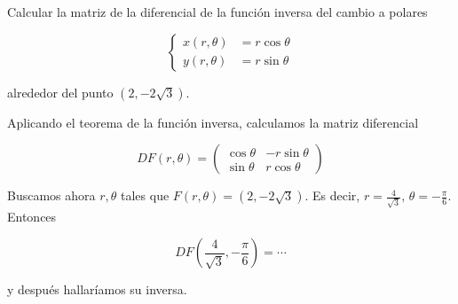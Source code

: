 \begin{problem}[9]
Calcular la matriz de la diferencial de la función inversa del cambio a polares

\[ \begin{cases}
x(r,θ) &= r\cos θ \\
y(r,θ) &= r\sin θ
\end{cases} \]

alrededor del punto $(2, -2\sqrt{3})$.

\solution

Aplicando el teorema de la función inversa, calculamos la matriz diferencial

\[  DF(r,θ) = \begin{pmatrix}
\cos θ & - r \sin θ \\
\sin θ & r \cos θ
\end{pmatrix} \]

Buscamos ahora $r,θ$ tales que $F(r,θ) = (2, -2\sqrt{3})$. Es decir, $r=\frac{4}{\sqrt{3}},\,θ = -\frac{\pi }{6}$. Entonces

\[ DF\left(\frac{4}{\sqrt{3}}, -\frac{\pi }{6}\right) = \dotsb \]

y después hallaríamos su inversa.

\end{problem}

